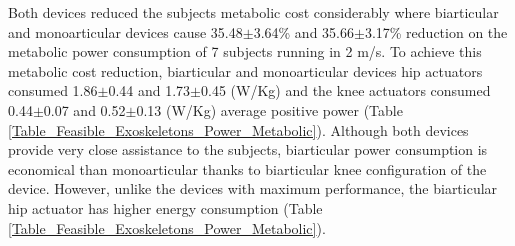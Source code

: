 \documentclass[10pt,letterpaper]{article}
\begin{document}
Both devices reduced the subjects metabolic cost considerably where biarticular and monoarticular devices cause 35.48$\pm$3.64\% and 35.66$\pm$3.17\% reduction on the metabolic power consumption of 7 subjects running in 2 m/s. To achieve this metabolic cost reduction, biarticular and monoarticular devices hip actuators consumed 1.86$\pm$0.44 and 1.73$\pm$0.45 (W/Kg) and the knee actuators consumed 0.44$\pm$0.07 and 0.52$\pm$0.13 (W/Kg) average positive power (Table \ref{Table_Feasible_Exoskeletons_Power_Metabolic}). Although both devices provide very close assistance to the subjects, biarticular power consumption is economical than monoarticular thanks to biarticular knee configuration of the device. However, unlike the devices with maximum performance, the biarticular hip actuator has higher energy consumption (Table \ref{Table_Feasible_Exoskeletons_Power_Metabolic}).
\end{document}
